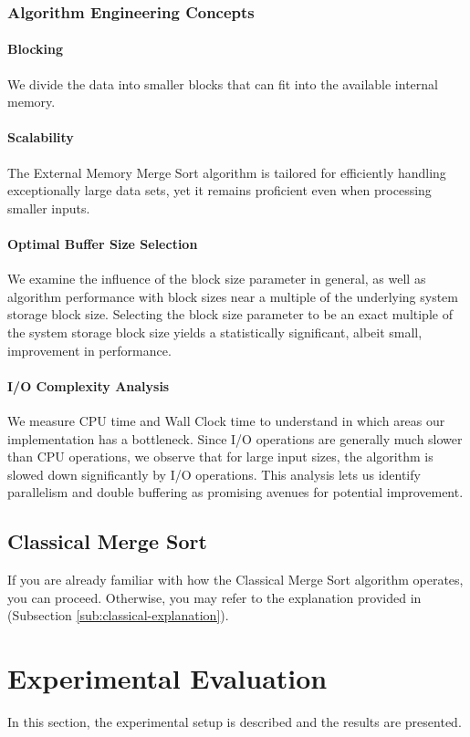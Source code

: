 \documentclass[twocolumn]{article}
\begin{document}
\subsubsection*{Algorithm Engineering Concepts}

\paragraph*{Blocking}
We divide the data into smaller blocks that can fit into the available internal memory.
\paragraph*{Scalability}
The External Memory Merge Sort algorithm is tailored for efficiently handling exceptionally large data sets, yet it remains proficient even when processing smaller inputs.
\paragraph*{Optimal Buffer Size Selection}
We examine the influence of the block size parameter in general, as well as algorithm performance with block sizes near a multiple of the underlying system storage block size.
Selecting the block size parameter to be an exact multiple of the system storage block size yields a statistically significant, albeit small, improvement in performance.
\paragraph*{I/O Complexity Analysis}
We measure CPU time and Wall Clock time to understand in which areas our implementation has a bottleneck. Since I/O operations are generally much slower than CPU operations,
we observe that for large input sizes, the algorithm is slowed down significantly by I/O operations. This analysis lets us identify parallelism and double buffering as promising avenues for potential improvement.

\subsection{Classical Merge Sort}
If you are already familiar with how the Classical Merge Sort algorithm operates, you can proceed. Otherwise, you may refer to the explanation provided in (Subsection \ref{sub:classical-explanation}).


\section{Experimental Evaluation}
In this section, the experimental setup is described and the results are presented.
\end{document}
